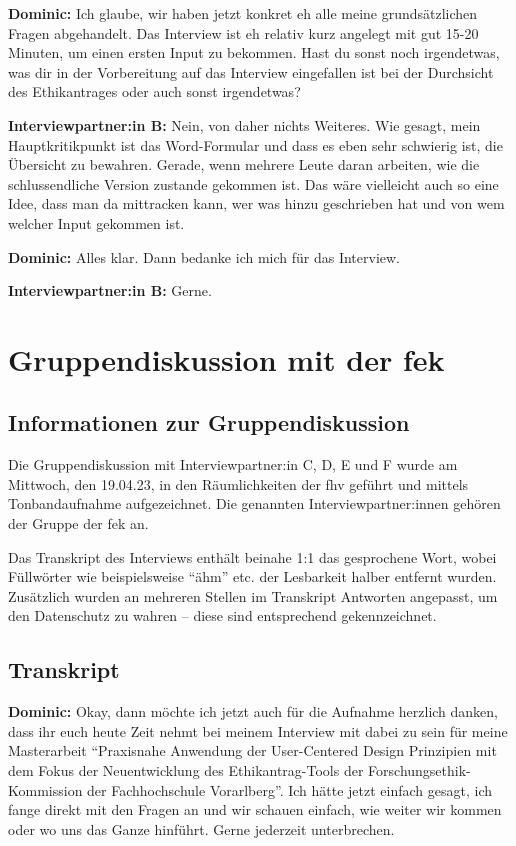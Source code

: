 \documentclass[a4paper,12pt,twoside]{scrreprt}
\begin{document}
\textbf{Dominic:} Ich glaube, wir haben jetzt konkret eh alle meine grundsätzlichen Fragen abgehandelt. Das Interview ist eh relativ kurz angelegt mit gut 15-20 Minuten, um einen ersten Input zu bekommen. Hast du sonst noch irgendetwas, was dir in der Vorbereitung auf das Interview eingefallen ist bei der Durchsicht des Ethikantrages oder auch sonst irgendetwas?

\textbf{Interviewpartner:in B:} Nein, von daher nichts Weiteres. Wie gesagt, mein Hauptkritikpunkt ist das Word-Formular und dass es eben sehr schwierig ist, die Übersicht zu bewahren. Gerade, wenn mehrere Leute daran arbeiten, wie die schlussendliche Version zustande gekommen ist. Das wäre vielleicht auch so eine Idee, dass man da mittracken kann, wer was hinzu geschrieben hat und von wem welcher Input gekommen ist.

\textbf{Dominic:} Alles klar. Dann bedanke ich mich für das Interview.

\textbf{Interviewpartner:in B:} Gerne.

\chapter{Gruppendiskussion mit der \acs{fek}}
\label{appendix:gruppendiskussion}

\section{Informationen zur Gruppendiskussion}
\label{appendix:gruppendiskussion-infos}

Die Gruppendiskussion mit Interviewpartner:in C, D, E und F wurde am Mittwoch, den 19.04.23, in den Räumlichkeiten der \ac{fhv} geführt und mittels Tonbandaufnahme aufgezeichnet. Die genannten Interviewpartner:innen gehören der Gruppe der \acl{fek} an.

Das Transkript des Interviews enthält beinahe 1:1 das gesprochene Wort, wobei Füllwörter wie beispielsweise \enquote{ähm} etc. der Lesbarkeit halber entfernt wurden. Zusätzlich wurden an mehreren Stellen im Transkript Antworten angepasst, um den Datenschutz zu wahren -- diese sind entsprechend gekennzeichnet.

\section{Transkript}
\label{appendix:gruppendiskussion-transkript}

\textbf{Dominic:} Okay, dann möchte ich jetzt auch für die Aufnahme herzlich danken, dass ihr euch heute Zeit nehmt bei meinem Interview mit dabei zu sein für meine Masterarbeit \enquote{Praxisnahe Anwendung der User-Centered Design Prinzipien mit dem Fokus der Neuentwicklung des Ethikantrag-Tools der Forschungsethik-Kommission der Fachhochschule Vorarlberg}. Ich hätte jetzt einfach gesagt, ich fange direkt mit den Fragen an und wir schauen einfach, wie weiter wir kommen oder wo uns das Ganze hinführt. Gerne jederzeit unterbrechen.
\end{document}
